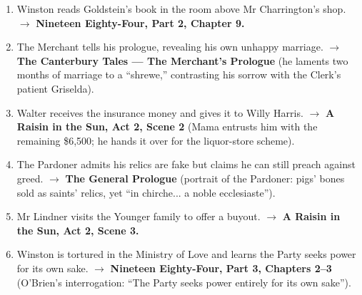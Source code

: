 \documentclass[11pt]{article}
\begin{document}
\begin{corrige}
\begin{enumerate}
\item Winston reads Goldstein's book in the room above Mr Charrington's shop. $\rightarrow$ \textbf{Nineteen Eighty-Four, Part 2, Chapter 9.}
\item The Merchant tells his prologue, revealing his own unhappy marriage. $\rightarrow$ \textbf{The Canterbury Tales --- The Merchant's Prologue} (he laments two months of marriage to a ``shrewe,'' contrasting his sorrow with the Clerk's patient Griselda).
\item Walter receives the insurance money and gives it to Willy Harris. $\rightarrow$ \textbf{A Raisin in the Sun, Act 2, Scene 2} (Mama entrusts him with the remaining \$6{,}500; he hands it over for the liquor-store scheme).
\item The Pardoner admits his relics are fake but claims he can still preach against greed. $\rightarrow$ \textbf{The General Prologue} (portrait of the Pardoner: pigs' bones sold as saints' relics, yet ``in chirche... a noble ecclesiaste'').
\item Mr Lindner visits the Younger family to offer a buyout. $\rightarrow$ \textbf{A Raisin in the Sun, Act 2, Scene 3.}
\item Winston is tortured in the Ministry of Love and learns the Party seeks power for its own sake. $\rightarrow$ \textbf{Nineteen Eighty-Four, Part 3, Chapters 2--3} (O'Brien's interrogation: ``The Party seeks power entirely for its own sake'').
\end{enumerate}
\end{corrige}
\end{document}
